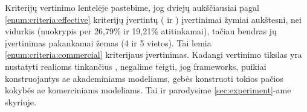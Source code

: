 \begin{criteriaTable}
\end{criteriaTable}

Kriterijų vertinimo lentelėje pastebime, jog dviejų aukščiausiai pagal \ref{enum:criteria:effective} kriterijų įvertintų  ( ir ) įvertinimai žymiai aukštesni, nei vidurkis (nuokrypis per 26,79\% ir 19,21\% atitinkamai), tačiau bendras jų įvertinimas pakankamai žemas (4 ir 5 vietos). Tai lemia \ref{enum:criteria:commercial} kriterijaus įvertinimas. Kadangi vertinimo tikslas yra nustatyti realioms  tinkančius , negalime teigti, jog \glspl{framework}, puikiai konstruojantys \acs{ae} akademiniams modeliams, gebės konstruoti tokios pačios kokybės \acs{ae} komerciniams modeliams. Tai ir parodysime \ref{sec:experiment}-ame skyriuje. 